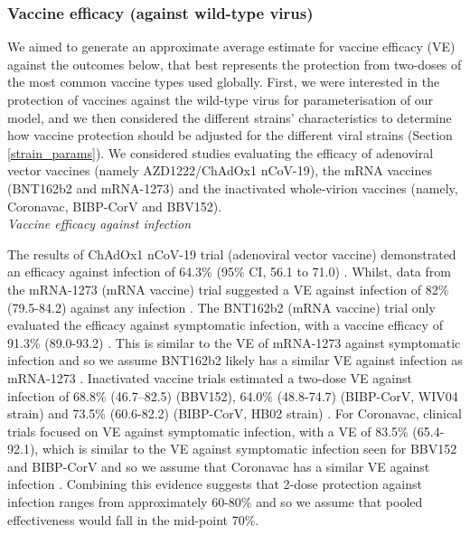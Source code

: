 \subsubsection{Vaccine efficacy (against wild-type virus)}
\label{vacc_params}
We aimed to generate an approximate average estimate for vaccine efficacy (VE) against the outcomes below, that best represents 
the protection from two-doses of the most common vaccine types used globally. First, we were interested in the protection 
of vaccines against the wild-type virus for parameterisation of our model, and we then considered the different strains' characteristics
to determine how vaccine protection should be adjusted for the different viral strains (Section \ref{strain_params}). 
We considered studies evaluating the efficacy of adenoviral vector vaccines (namely AZD1222/ChAdOx1 nCoV-19), the mRNA vaccines (BNT162b2 and mRNA-1273) and the 
inactivated whole-virion vaccines (namely, Coronavac, BIBP-CorV and BBV152).\\

\textit{Vaccine efficacy against infection}

The results of ChAdOx1 nCoV-19 trial (adenoviral vector vaccine) demonstrated an efficacy against infection of 
64.3\% (95\% CI, 56.1 to 71.0) \cite{falsey2021}. Whilst, data from the mRNA-1273 (mRNA vaccine) trial suggested a VE against infection 
of 82\% (79.5-84.2) against any infection \cite{elsahly2021}. The BNT162b2 (mRNA vaccine) trial only evaluated the efficacy 
against symptomatic infection, with a vaccine efficacy of 91.3\% (89.0-93.2) \cite{thomas2021}. This is similar to the VE of 
mRNA-1273 against symptomatic infection and so we assume BNT162b2 likely has a similar VE against infection as mRNA-1273 \cite{elsahly2021, thomas2021}.
Inactivated vaccine trials estimated a two-dose VE against infection of 68.8\% (46.7–82.5) (BBV152), 64.0\% (48.8-74.7) (BIBP-CorV, WIV04 strain) 
and 73.5\% (60.6-82.2) (BIBP-CorV, HB02 strain) \cite{ella2021, alkaabi2021}. For Coronavac, clinical trials focused on VE against 
symptomatic infection, with a VE of 83.5\% (65.4-92.1), which is similar to the VE against symptomatic infection seen for BBV152 and BIBP-CorV and 
so we assume that Coronavac has a similar VE against infection \cite{tanriover2021, ella2021, alkaabi2021}.
Combining this evidence suggests that 2-dose protection against infection ranges from approximately 60-80\% and so we assume that pooled effectiveness would fall in the mid-point 70\%.\\

